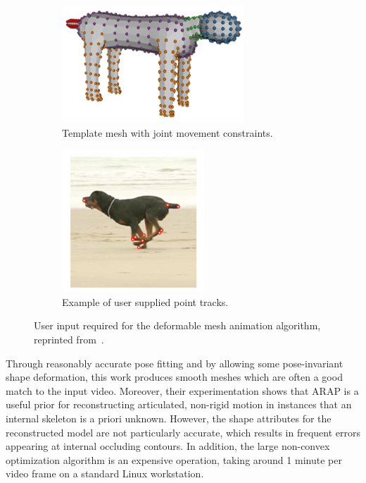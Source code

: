         \begin{figure}[H]
            \centering
            \begin{subfigure}{0.5\textwidth}
            \centering
                \includegraphics[height=0.5\linewidth]{arapsfm/arap_annotated_template}
                \caption{Template mesh with joint movement constraints.}
            \end{subfigure}%
            \begin{subfigure}{0.5\textwidth}
            \centering
                \includegraphics[height=0.5\linewidth]{arapsfm/arap_point_tracks}
                \caption{Example of user supplied point tracks.}
            \end{subfigure}%
            \caption{User input required for the deformable mesh animation algorithm, reprinted from~\cite{arap_stebbing}.}
            \label{fig:arap_user}
        \end{figure} 

        \clearpage
        Through reasonably accurate pose fitting and by allowing some pose-invariant shape deformation, this work produces smooth meshes which are often a good match to the input video. Moreover, their experimentation shows that ARAP is a useful prior for reconstructing articulated, non-rigid motion in instances that an internal skeleton is a priori unknown. However, the shape attributes for the reconstructed model are not particularly accurate, which results in frequent errors appearing at internal occluding contours. In addition, the large non-convex optimization algorithm is an expensive operation, taking around 1 minute per video frame on a standard Linux workstation.
        
